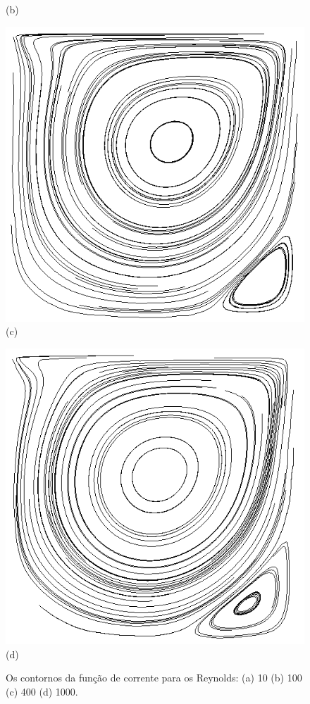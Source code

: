 \begin{figure}[H]
\begin{minipage}{.45\linewidth}
      (b)
     \end{minipage}
     \begin{minipage}{.45\linewidth}
      \centering
      \includegraphics[scale=0.3]{./02_chaps/cap_validation/figure/Re_400_stream_countours.png}\\
      (c)
     \end{minipage}%
     \begin{minipage}{.45\linewidth}
      \centering
      \includegraphics[scale=0.3]{./02_chaps/cap_validation/figure/Re_1000_stream_countours.png}\\
      (d)
     \end{minipage}
     \medskip
     \caption{Os contornos da função de corrente para os Reynolds:
     (a) 10
     (b) 100
     (c) 400
     (d) 1000.}
     \label{countours streamfunction}
\end{figure}


\newpage
